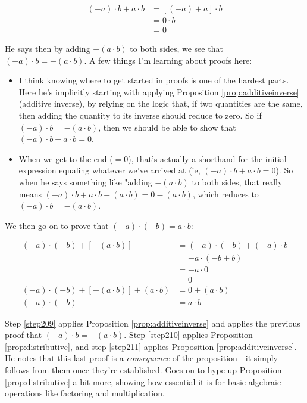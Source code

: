 \begin{align}
    (-a) \cdot b + a \cdot b &= [(-a) + a] \cdot b \label{step181}\\
                             &= 0 \cdot b\\
                             &= 0
\end{align}

He says then by adding $-(a \cdot b)$ to both sides, we see that $(-a) \cdot b = -(a \cdot
b)$. A few things I'm learning about proofs here:

\begin{itemize}

    \item I think knowing where to get started in proofs is one of the hardest parts. Here
        he's implicitly starting with applying Proposition \ref{prop:additiveinverse}
        (additive inverse), by relying on the logic that, if two quantities are the same,
        then adding the quantity to its inverse should reduce to zero. So if $(-a) \cdot b
        = -(a \cdot b)$, then we should be able to show that $(-a) \cdot b + a\cdot b =
        0$.
    \item When we get to the end ($=0$), that's actually a shorthand for the initial
        expression equaling whatever we've arrived at (ie, $(-a) \cdot b + a \cdot b =
        0$). So when he says something like "adding $-(a\cdot b)$ to both sides, that
        really means $(-a) \cdot b + a \cdot b - (a \cdot b) = 0 - (a \cdot b)$, which
        reduces to $(-a) \cdot b = - (a \cdot b)$.

\end{itemize}

We then go on to prove that $(-a) \cdot (-b) = a \cdot b$:

\begin{align}
    (-a) \cdot (-b) + [-(a \cdot b)] &= (-a) \cdot (-b) + (-a) \cdot b\label{step209}\\
                                 &= -a \cdot (-b + b)\label{step210}\\
                                 &= -a \cdot 0 \label{step211}\\
                                 &= 0 \\
    (-a) \cdot (-b) + [-(a \cdot b)] + (a \cdot b) &= 0 + (a\cdot b)\\
    (-a) \cdot (-b) &= a \cdot b
\end{align}

Step \ref{step209} applies Proposition \ref{prop:additiveinverse} and applies the previous
proof that $(-a) \cdot b = -(a \cdot b)$. Step \ref{step210} applies Proposition
\ref{prop:distributive}, and step \ref{step211} applies Proposition
\ref{prop:additiveinverse}. He notes that this last proof is a \emph{consequence} of the
proposition---it simply follows from them once they're established. Goes on to hype up
Proposition \ref{prop:distributive} a bit more, showing how essential it is for basic
algebraic operations like factoring and multiplication.

